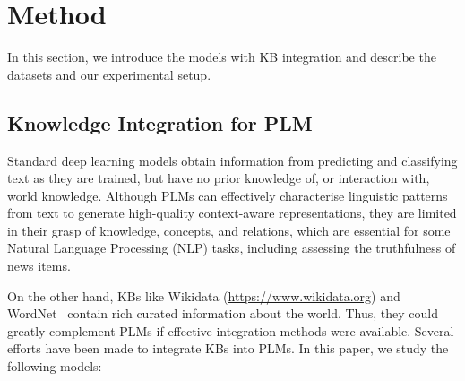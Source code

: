 \documentclass[letterpaper]{article} %
\begin{document}
\section{Method}

In this section, we introduce the models with KB integration and describe the datasets and our experimental setup.

\subsection{Knowledge Integration for PLM}
Standard deep learning models obtain information from predicting and classifying text as they are trained, but have no prior knowledge of, or interaction with, world knowledge.
Although PLMs can effectively characterise linguistic patterns from text to generate high-quality context-aware representations, they are limited in their grasp of knowledge, concepts, and relations, which are essential for some Natural Language Processing (NLP) tasks, including assessing the truthfulness of news items.

On the other hand, KBs like Wikidata (\url{https://www.wikidata.org}) and WordNet~\cite{Miller1995WordNetAL} contain rich curated information about the world.
Thus, they could greatly complement PLMs if effective integration methods were available.
Several efforts have been made to integrate KBs into PLMs.
In this paper, we study the following models:
\end{document}
